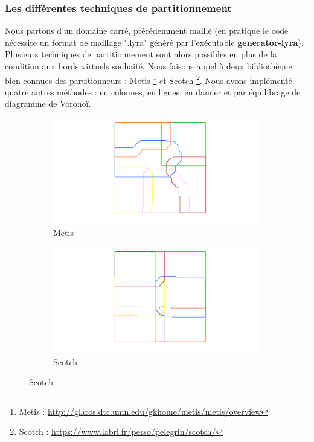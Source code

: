 \documentclass[a4paper,11pt]{article}
\begin{document}
\subsubsection{Les différentes techniques de partitionnement}
\noindent Nous partons d'un domaine carré, précédemment maillé (en pratique le code nécessite un format de maillage ".lyra" généré par l'exécutable \textbf{generator-lyra}). Plusieurs techniques de partitionnement sont alors possibles en plus de la condition aux bords virtuels souhaité. Nous faisons appel à deux bibliothèque bien connues des partitionneurs : Metis \footnote{Metis : \url{http://glaros.dtc.umn.edu/gkhome/metis/metis/overview}} et Scotch \footnote{Scotch : \url{https://www.labri.fr/perso/pelegrin/scotch/}}. Nous avons implémenté quatre autres méthodes : en colonnes, en lignes, en damier et par équilibrage de diagramme de Voronoï.
\begin{figure}[H]
	\centering
	\begin{subfigure}[b]{0.45\textwidth}
		\hspace{-2.5cm}
		\includegraphics[width=1.5\textwidth]{metis_6.png}
		\caption{Metis}
	\end{subfigure}
\hfill
	\begin{subfigure}[b]{0.45\textwidth}
		\hspace{-2.5cm}
		\includegraphics[width=1.5\textwidth]{scotch_6.png}
		\caption{Scotch}
	\end{subfigure}
\end{figure}
\end{document}
